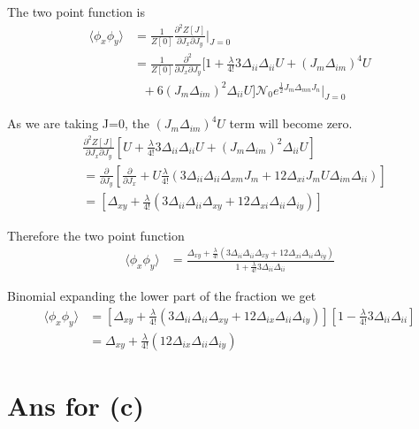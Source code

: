 \documentclass[12pt, letterpaper]{article}
\newcommand*{\1}{\hspace{1pt}}
\begin{document}
    The two point function is
    \begin{align*}
        \langle \phi_{x}\phi_{y} \rangle & = \frac{1}{Z[0]}\frac{\partial ^2 Z[J]}{\partial J_{x} \partial J_{y}}\Biggr|_{J=0} \\
        & =  \frac{1}{Z[0]}\frac{\partial ^2 }{\partial J_{x} \partial J_{y}}  [1+\frac{\lambda}{4!}3\Delta_{ii}\Delta_{ii}U + (J_{m}\Delta_{im})^{4} U \\
        & \ \ \  + 6(J_{m}\Delta_{im})^{2}\Delta_{ii} U]\mathcal{N}_{0} e^{\frac{1}{2} J_{m} \Delta _{mn} J_{n}}\Biggr|_{J=0}
    \end{align*}

    As we are taking J=0, the  $(J_{m}\Delta_{im})^{4} U$ term will become zero.
    \begin{align*}
         &\frac{\partial ^2 Z[J]}{\partial J_{x} \partial J_{y}}  [U+\frac{\lambda}{4!}3\Delta_{ii}\Delta_{ii}U + (J_{m}\Delta_{im})^{2}\Delta_{ii} U] \\
         & = \frac{\partial }{\partial J_{y}}[\frac{\partial}{\partial J_{x}} + U \frac{\lambda}{4!}(3\Delta_{ii}\Delta_{ii}\Delta_{xm}J_{m} + 12\Delta_{xi}J_{m}U\Delta_{im}\Delta_{ii})] \\ 
         & = [\Delta_{xy} + \frac{\lambda}{4!}(3\Delta_{ii}\Delta_{ii}\Delta_{xy} + 12\Delta_{xi}\Delta_{ii}\Delta_{iy})]
    \end{align*}

    Therefore the two point function
    \begin{align}
        \langle \phi_{x}\phi_{y} \rangle & = \frac{\Delta_{xy} + \frac{\lambda}{4!}(3\Delta_{ii}\Delta_{ii}\Delta_{xy} + 12\Delta_{xi}\Delta_{ii}\Delta_{iy})}{1+\frac{\lambda}{4!} 3\Delta_{ii}\Delta_{ii}}
    \end{align}

    Binomial expanding the lower part of the fraction we get
     \begin{align}
        \langle \phi_{x}\phi_{y} \rangle & = [\Delta_{xy} + \frac{\lambda}{4!}( 3\Delta_{ii}\Delta_{ii}\Delta_{xy} + 12\Delta_{ix}\Delta_{ii}\Delta_{iy})][1-\frac{\lambda}{4!} 3\Delta_{ii}\Delta_{ii}] \\
        & = \Delta_{xy} + \frac{\lambda}{4!}(12\Delta_{ix}\Delta_{ii}\Delta_{iy})
    \end{align}
    
    \newpage
    \section*{Ans for (c)}
\end{document}
